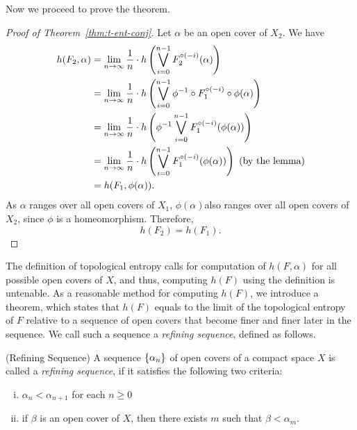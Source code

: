 \documentclass[12pt,twoside,draft]{book}
\begin{document}
Now we proceed to prove the theorem.
\begin{proof}[Proof of Theorem~\ref{thm:t-ent-conj}]
  Let $\alpha$ be an open cover of $X_2$.
  We have
  \begin{align*}
    h(F_2, \alpha)
    &= \lim\limits_{n \to \infty} \frac{1}{n} \cdot h \left ( \bigvee\limits_{i = 0}^{n-1} F_2^{\circ (-i)}(\alpha) \right ) \\
    &= \lim\limits_{n \to \infty} \frac{1}{n} \cdot h \left ( \bigvee\limits_{i = 0}^{n-1} \phi^{-1} \circ F_1^{\circ (-i)} \circ \phi (\alpha) \right ) \\
    &= \lim\limits_{n \to \infty} \frac{1}{n} \cdot h \left ( \phi^{-1} \bigvee\limits_{i = 0}^{n-1} F_1^{\circ (-i)} (\phi (\alpha)) \right ) \\
    &= \lim\limits_{n \to \infty} \frac{1}{n} \cdot h \left ( \bigvee\limits_{i = 0}^{n-1} F_1^{\circ (-i)} (\phi (\alpha)) \right ) \mbox{ (by the lemma)} \\
    &= h(F_1, \phi(\alpha)).
  \end{align*}
  As $\alpha$ ranges over all open covers of $X_1$, $\phi(\alpha)$also ranges over all open covers of $X_2$, since $\phi$ is a homeomorphism.
  Therefore,
  \begin{equation*}
    h(F_2) = h(F_1).
  \end{equation*}
\end{proof}

The definition of topological entropy calls for computation of $h(F,\alpha)$ for all possible open covers of $X$, and thus, computing $h(F)$ using the definition is untenable.
As a reasonable method for computing $h(F)$, we introduce a theorem, which states that $h(F)$ equals to the limit of the topological entropy of $F$ relative to a sequence of open covers that become finer and finer later in the sequence.
We call such a sequence a \textit{refining sequence}, defined as follows.

\begin{definition}
  (Refining Sequence)
  A sequence $\left \{ \alpha_n \right \}$ of open covers of a compact space $X$ is called a \textit{refining sequence}, if it satisfies the following two criteria:
  \begin{enumerate}[(i)]
    \item $\alpha_n < \alpha_{n+1}$ for each $n\geq 0$
    \item if $\beta$ is an open cover of $X$, then there exists $m$ such that $\beta < \alpha_m$.
  \end{enumerate}
\end{definition}
\end{document}
